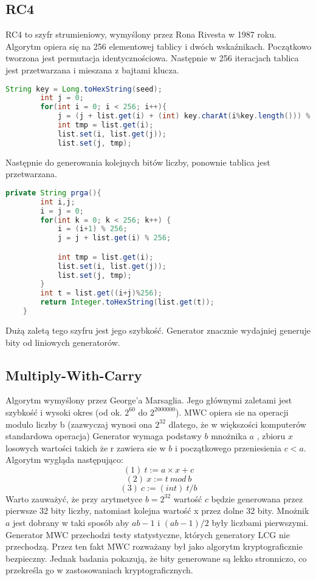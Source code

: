 \documentclass[a4paper, 11pt]{article} %
\begin{document}
\subsection{RC4}
RC4 to szyfr strumieniowy, wymyślony przez Rona Rivesta w 1987 roku. Algorytm opiera się na 256 elementowej tablicy i dwóch wskaźnikach. Początkowo tworzona jest permutacja identycznościowa. Następnie w 256 iteracjach tablica jest przetwarzana i mieszana z bajtami klucza.
\begin{lstlisting}[style=mystyle, language=java, frame=single, caption = Inicjalizowanie RC4.]
        String key = Long.toHexString(seed);
        int j = 0;
        for(int i = 0; i < 256; i++){
            j = (j + list.get(i) + (int) key.charAt(i%key.length())) % 256;
            int tmp = list.get(i);
            list.set(i, list.get(j));
            list.set(j, tmp);
\end{lstlisting}
Następnie do generowania kolejnych bitów liczby, ponownie tablica jest przetwarzana.
\begin{lstlisting}[style=mystyle, language=java, frame=single, caption = Generowanie losowego bajtu liczby za pomocą RC4.]
    private String prga(){
        int i,j;
        i = j = 0;
        for(int k = 0; k < 256; k++) {
        	i = (i+1) % 256;
        	j = j + list.get(i) % 256;

        	int tmp = list.get(i);
        	list.set(i, list.get(j));
        	list.set(j, tmp);
        }
        int t = list.get((i+j)%256);
        return Integer.toHexString(list.get(t));
    }
\end{lstlisting}
Dużą zaletą tego szyfru jest jego szybkość. Generator znacznie wydajniej generuje bity od liniowych generatorów. 
\subsection{Multiply-With-Carry}
Algorytm wymyślony przez George'a Marsaglia. Jego głównymi zaletami jest szybkość i wysoki okres (od ok. $2^{60} $ do $2^{2000000}$).
MWC opiera sie na operacji modulo liczby b (zazwyczaj wynosi ona $2^{32}$ dlatego, że w większości komputerów standardowa operacja) 
Generator wymaga podstawy $b$ mnożnika $a$ , zbioru $x$ losowych wartości takich że r zawiera sie w $b$ i początkowego przeniesienia $c < a$. 
Algorytm wygląda następująco:
$$(1)\ t:=a \times x + c $$
$$(2)\ x:= t \ mod \ b $$
$$(3)\ c:= (int)\ t/b$$
Warto zauważyć, że przy arytmetyce $b=2^{32}$ wartość $c$ będzie generowana przez pierwsze 32 bity liczby, natomiast kolejna wartość x przez dolne 32 bity. Mnożnik $a$ jest dobrany w taki sposób aby $ab-1$ i $(ab-1)/2$ były liczbami pierwszymi.
\newline Generator MWC przechodzi testy statystyczne, których generatory LCG nie przechodzą. Przez ten fakt MWC rozważany był jako algorytm kryptograficznie bezpieczny. Jednak badania pokazują, że bity generowane są lekko stronniczo, co przekreśla go w zastosowaniach kryptograficznych.	
\end{document}
